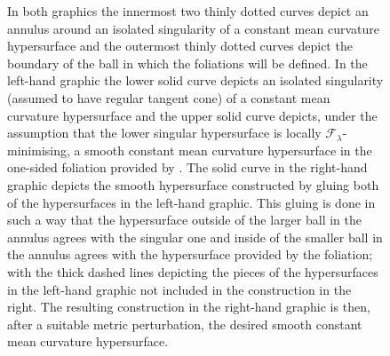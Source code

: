 \documentclass[11pt]{article}
\begin{document}
\begin{figure}[H]
\begin{tikzpicture}[scale=-0.02, xscale=-1]
\end{tikzpicture}
    \caption{In both graphics the innermost two thinly dotted curves depict an annulus around an isolated singularity of a constant mean curvature hypersurface and the outermost thinly dotted curves depict the boundary of the ball in which the foliations will be defined. In the left-hand graphic the lower solid curve depicts an isolated singularity (assumed to have regular tangent cone) of a constant mean curvature hypersurface and the upper solid curve depicts, under the assumption that the lower singular hypersurface is locally $\mathcal{F}_\lambda$-minimising, a smooth constant mean curvature hypersurface in the one-sided foliation provided by \cite{Kostas23}. The solid curve in the right-hand graphic depicts the smooth hypersurface constructed by gluing both of the hypersurfaces in the left-hand graphic. This gluing is done in such a way that the hypersurface outside of the larger ball in the annulus agrees with the singular one and inside of the smaller ball in the annulus agrees with the hypersurface provided by the foliation; with the thick dashed lines depicting the pieces of the hypersurfaces in the left-hand graphic not included in the construction in the right. The resulting construction in the right-hand graphic is then, after a suitable metric perturbation, the desired smooth constant mean curvature hypersurface.}
    \label{fig: surgery}
\end{figure}
\end{document}
